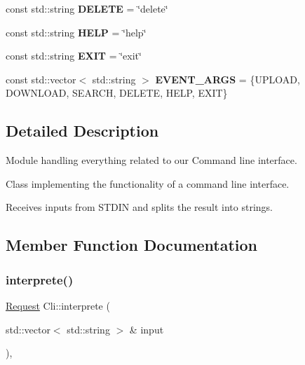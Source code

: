 \begin{DoxyCompactItemize}
\item 
\mbox{\label{classCli_acca3f466bba719de9ac3a491e7aa02c8}} 
const std\+::string {\bfseries D\+E\+L\+E\+TE} = \char`\"{}delete\char`\"{}
\item 
\mbox{\label{classCli_adf56775dc41676f404c6f83f48b92c95}} 
const std\+::string {\bfseries H\+E\+LP} = \char`\"{}help\char`\"{}
\item 
\mbox{\label{classCli_a277fa8260456d4eda6fd69022c29f2fe}} 
const std\+::string {\bfseries E\+X\+IT} = \char`\"{}exit\char`\"{}
\item 
\mbox{\label{classCli_a3610685c550060a08adb0fd78ee6866e}} 
const std\+::vector$<$ std\+::string $>$ {\bfseries E\+V\+E\+N\+T\+\_\+\+A\+R\+GS} = \{U\+P\+L\+O\+AD, D\+O\+W\+N\+L\+O\+AD, S\+E\+A\+R\+CH, D\+E\+L\+E\+TE, H\+E\+LP, E\+X\+IT\}
\end{DoxyCompactItemize}


\subsection{Detailed Description}
Module handling everything related to our Command line interface. 

Class implementing the functionality of a command line interface.

Receives inputs from S\+T\+D\+IN and splits the result into strings. 

\subsection{Member Function Documentation}
\mbox{\label{classCli_af29a5d8a0c3863f69c0e21133dee2d1b}} 
\subsubsection{\texorpdfstring{interprete()}{interprete()}}
{\footnotesize\ttfamily \hyperlink{classRequest}{Request} Cli\+::interprete (\begin{DoxyParamCaption}\item[{std\+::vector$<$ std\+::string $>$ \&}]{input }\end{DoxyParamCaption})\hspace{0.3cm}{\ttfamily [override]}, {\ttfamily [virtual]}}



